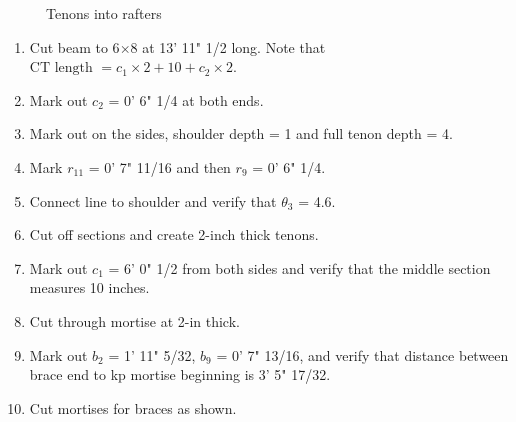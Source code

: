 \documentclass{article}\usepackage[]{graphicx}\usepackage[]{xcolor}
\begin{document}
\begin{figure}[h]       
    \hspace{30px}
    \caption{Tenons into rafters}
\end{figure}





\begin{enumerate}
  \item Cut beam to 6$\times$8 at 13' 11" 1/2 long. Note that $\text{CT length }= c_1\times 2 + 10 + c_2\times 2$. 
  \item Mark out $c_2$ = 0' 6" 1/4 at both ends.
  \item Mark out on the sides, shoulder depth = 1 and full tenon depth = 4.
  \item Mark $r_{11}$ = 0' 7" 11/16 and then $r_9$ = 0' 6" 1/4. 
  \item Connect line to shoulder and verify that $\theta_3$ = 4.6. 
  \item Cut off sections and create 2-inch thick tenons. 
  \item Mark out $c_1$ = 6' 0" 1/2 from both sides and verify that the middle section measures 10 inches.
  \item Cut through mortise at 2-in thick.
  \item Mark out $b_2$ = 1' 11" 5/32, $b_9$ = 0' 7" 13/16, and verify that distance between brace end to kp mortise beginning is 3' 5" 17/32. 
  \item Cut mortises for braces as shown. 
\end{enumerate}
\end{document}
